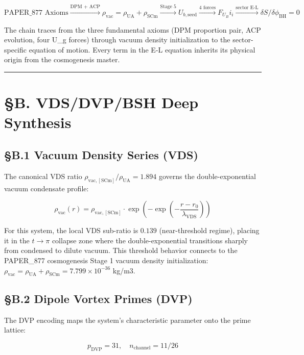 \documentclass[12pt,a4paper]{article}
\begin{document}
\begin{equation}
\text{PAPER\_877 Axioms} \xrightarrow{\text{DPM + ACP}} \rho_{\mathrm{vac}} = \rho_{\mathrm{UA}} + \rho_{\mathrm{SCm}} \xrightarrow{\text{Stage 5}} U_{b,\mathrm{seed}} \xrightarrow{\text{4 forces}} F_U_Bi_i \xrightarrow{\text{sector E-L}} \delta S/\delta \phi_{\mathrm{BH}} = 0
\end{equation}

The chain traces from the three fundamental axioms (DPM proportion pair, ACP evolution, four U\_g forces) through vacuum density initialization to the sector-specific equation of motion. Every term in the E-L equation inherits its physical origin from the cosmogenesis master.

\medskip\hrule\medskip

\section{\S{}B. VDS/DVP/BSH Deep Synthesis}

\subsection{\S{}B.1 Vacuum Density Series (VDS)}

The canonical VDS ratio $\rho_{\mathrm{vac,[SCm]}} / \rho_{\mathrm{UA}} = 1.894$ governs the double-exponential vacuum condensate profile:

\begin{equation}
\rho_{\mathrm{vac}}(r) = \rho_{\mathrm{vac,[SCm]}} \cdot \exp\!\left(-\exp\!\left(-\frac{r - r_0}{\lambda_{\mathrm{VDS}}}\right)\right)
\end{equation}

For this system, the local VDS sub-ratio is $0.139$ (near-threshold regime), placing it in the $t \to \pi$ collapse zone where the double-exponential transitions sharply from condensed to dilute vacuum. This threshold behavior connects to the PAPER\_877 cosmogenesis Stage 1 vacuum density initialization: $\rho_{\mathrm{vac}} = \rho_{\mathrm{UA}} + \rho_{\mathrm{SCm}} = 7.799 \times 10^{-36}$ kg/m3.

\subsection{\S{}B.2 Dipole Vortex Primes (DVP)}

The DVP encoding maps the system's characteristic parameter onto the prime lattice:

\begin{equation}
p_{\mathrm{DVP}} = 31, \quad n_{\mathrm{channel}} = 11/26
\end{equation}
\end{document}
